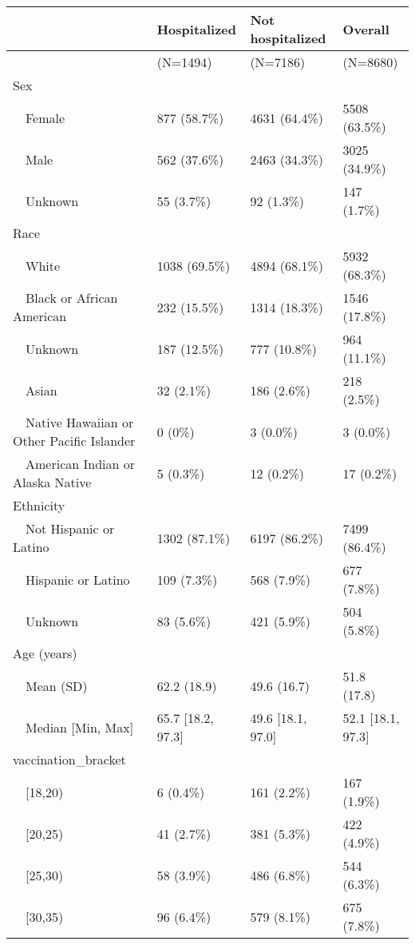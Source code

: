 \begin{table}[ht]
\centering
\begin{tabular}{llll}
  \hline
  & Hospitalized & Not hospitalized & Overall \\ 
  \hline
 & (N=1494) & (N=7186) & (N=8680) \\ 
  Sex &  &  &  \\ 
    Female & 877 (58.7\%) & 4631 (64.4\%) & 5508 (63.5\%) \\ 
    Male & 562 (37.6\%) & 2463 (34.3\%) & 3025 (34.9\%) \\ 
    Unknown & 55 (3.7\%) & 92 (1.3\%) & 147 (1.7\%) \\ 
  Race &  &  &  \\ 
    White & 1038 (69.5\%) & 4894 (68.1\%) & 5932 (68.3\%) \\ 
    Black or African American & 232 (15.5\%) & 1314 (18.3\%) & 1546 (17.8\%) \\ 
    Unknown & 187 (12.5\%) & 777 (10.8\%) & 964 (11.1\%) \\ 
    Asian & 32 (2.1\%) & 186 (2.6\%) & 218 (2.5\%) \\ 
    Native Hawaiian or Other Pacific Islander & 0 (0\%) & 3 (0.0\%) & 3 (0.0\%) \\ 
    American Indian or Alaska Native & 5 (0.3\%) & 12 (0.2\%) & 17 (0.2\%) \\ 
  Ethnicity &  &  &  \\ 
    Not Hispanic or Latino & 1302 (87.1\%) & 6197 (86.2\%) & 7499 (86.4\%) \\ 
    Hispanic or Latino & 109 (7.3\%) & 568 (7.9\%) & 677 (7.8\%) \\ 
    Unknown & 83 (5.6\%) & 421 (5.9\%) & 504 (5.8\%) \\ 
  Age (years) &  &  &  \\ 
    Mean (SD) & 62.2 (18.9) & 49.6 (16.7) & 51.8 (17.8) \\ 
    Median [Min, Max] & 65.7 [18.2, 97.3] & 49.6 [18.1, 97.0] & 52.1 [18.1, 97.3] \\ 
  vaccination\_bracket &  &  &  \\ 
    [18,20) & 6 (0.4\%) & 161 (2.2\%) & 167 (1.9\%) \\ 
    [20,25) & 41 (2.7\%) & 381 (5.3\%) & 422 (4.9\%) \\ 
    [25,30) & 58 (3.9\%) & 486 (6.8\%) & 544 (6.3\%) \\ 
    [30,35) & 96 (6.4\%) & 579 (8.1\%) & 675 (7.8\%) \\ 

\end{tabular}
\end{table}
